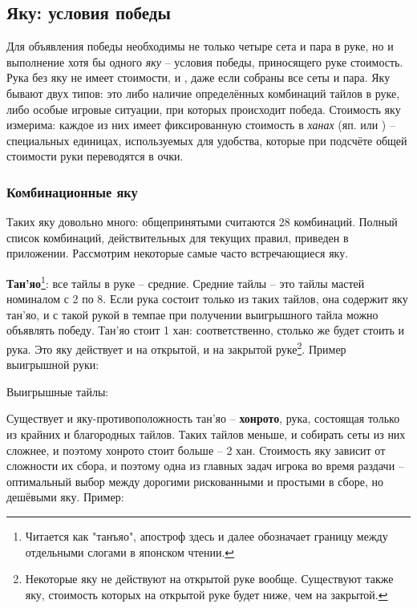\subsection{Яку: условия победы}

Для объявления победы необходимы не только четыре сета и пара в руке, но и выполнение хотя бы одного \textit{яку} – условия победы, приносящего руке стоимость. Рука без яку не имеет стоимости, и , даже если собраны все сеты и пара. Яку бывают двух типов: это либо наличие определённых комбинаций тайлов в руке, либо особые игровые ситуации, при которых происходит победа. Стоимость яку измерима: каждое из них имеет фиксированную стоимость в \textit{ханах} (яп.  или ) – специальных единицах, используемых для удобства, которые при подсчёте общей стоимости руки переводятся в очки.

\subsubsection{Комбинационные яку}

Таких яку довольно много: общепринятыми считаются 28 комбинаций. Полный список комбинаций, действительных для текущих правил, приведен в приложении. Рассмотрим некоторые самые часто встречающиеся яку.

\textbf{Тан'яо}\footnote{Читается как "танъяо", апостроф здесь и далее обозначает границу между отдельными слогами в японском чтении.}: все тайлы в руке – средние. Средние тайлы – это тайлы мастей номиналом с 2 по 8. Если рука состоит только из таких тайлов, она содержит яку тан'яо, и с такой рукой в темпае при получении выигрышного тайла можно объявлять победу. Тан'яо стоит 1 хан: соответственно, столько же будет стоить и рука. Это яку действует и на открытой, и на закрытой руке\footnote{Некоторые яку не действуют на открытой руке вообще. Существуют также яку, стоимость которых на открытой руке будет ниже, чем на закрытой.}. Пример выигрышной руки:

\hfill {}

Выигрышные тайлы: 

Существует и яку-противоположность тан'яо – \textbf{хонрото}, рука, состоящая только из крайних и благородных тайлов. Таких тайлов меньше, и собирать сеты из них сложнее, и поэтому хонрото стоит больше – 2 хан. Стоимость яку зависит от сложности их сбора, и поэтому одна из главных задач игрока во время раздачи – оптимальный выбор между дорогими рискованными и простыми в сборе, но дешёвыми яку. Пример:

